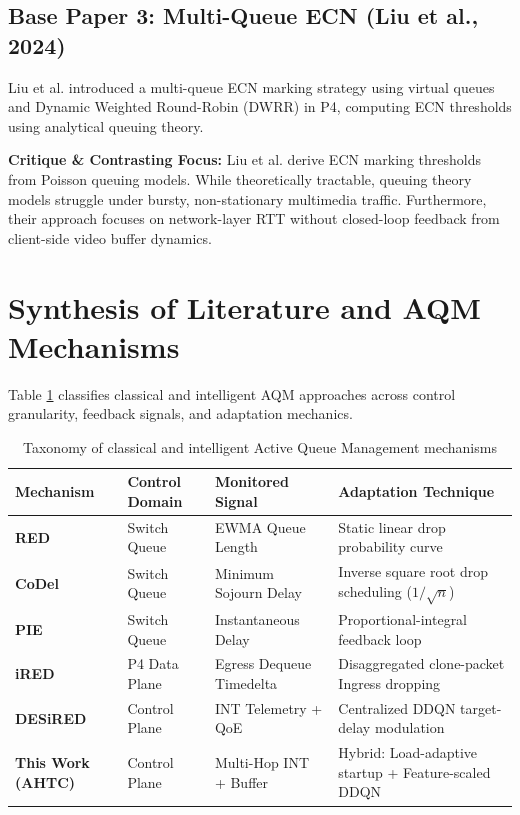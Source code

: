 \documentclass[12pt,a4paper,oneside]{report}
\begin{document}
\subsection{Base Paper 3: Multi-Queue ECN (Liu et al., 2024)}
Liu et al. \cite{liu2024multiqueue} introduced a multi-queue ECN marking strategy using virtual queues and Dynamic Weighted Round-Robin (DWRR) in P4, computing ECN thresholds using analytical queuing theory.

\textbf{Critique \& Contrasting Focus:} Liu et al. derive ECN marking thresholds from Poisson queuing models. While theoretically tractable, queuing theory models struggle under bursty, non-stationary multimedia traffic. Furthermore, their approach focuses on network-layer RTT without closed-loop feedback from client-side video buffer dynamics.

\section{Synthesis of Literature and AQM Mechanisms}
Table \ref{tab:aqm_taxonomy} classifies classical and intelligent AQM approaches across control granularity, feedback signals, and adaptation mechanics.

\begin{table}[H]
\centering
\small
\caption{Taxonomy of classical and intelligent Active Queue Management mechanisms}
\label{tab:aqm_taxonomy}
\begin{tabularx}{\textwidth}{p{}p{}p{}X}
\toprule
\textbf{Mechanism} & \textbf{Control Domain} & \textbf{Monitored Signal} & \textbf{Adaptation Technique} \\
\midrule
\textbf{RED} \cite{floyd1993red} & Switch Queue & EWMA Queue Length & Static linear drop probability curve \\
\textbf{CoDel} \cite{nichols2012codel} & Switch Queue & Minimum Sojourn Delay & Inverse square root drop scheduling ($1/\sqrt{n}$) \\
\textbf{PIE} \cite{pan2013pie} & Switch Queue & Instantaneous Delay & Proportional-integral feedback loop \\
\textbf{iRED} \cite{silva2021ired} & P4 Data Plane & Egress Dequeue Timedelta & Disaggregated clone-packet Ingress dropping \\
\textbf{DESiRED} \cite{almeida2023desired} & Control Plane & INT Telemetry + QoE & Centralized DDQN target-delay modulation \\
\textbf{This Work (AHTC)} & Control Plane & Multi-Hop INT + Buffer & Hybrid: Load-adaptive startup + Feature-scaled DDQN \\
\bottomrule
\end{tabularx}
\end{table}
\end{document}
